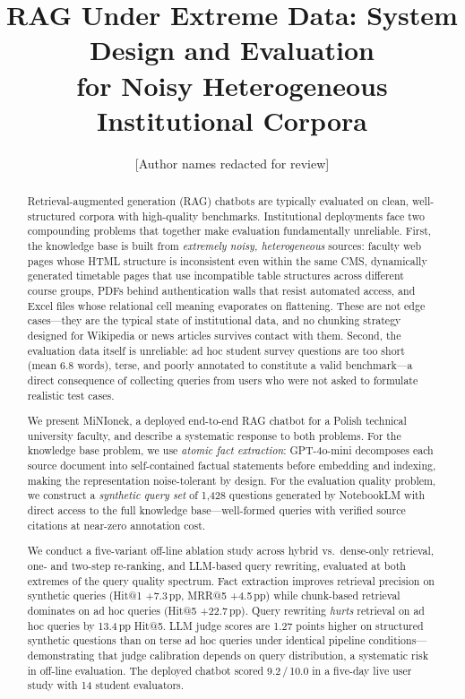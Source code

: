 \documentclass[sigconf,natbib=true]{acmart}
\begin{document}
\title{RAG Under Extreme Data: System Design and Evaluation\\for Noisy Heterogeneous Institutional Corpora}

\author{[Author names redacted for review]}

\begin{abstract}
Retrieval-augmented generation (RAG) chatbots are typically evaluated on clean, well-structured corpora with high-quality benchmarks.
Institutional deployments face two compounding problems that together make evaluation fundamentally unreliable.
First, the knowledge base is built from \emph{extremely noisy, heterogeneous} sources: faculty web pages whose HTML structure is inconsistent even within the same CMS, dynamically generated timetable pages that use incompatible table structures across different course groups, PDFs behind authentication walls that resist automated access, and Excel files whose relational cell meaning evaporates on flattening.
These are not edge cases---they are the typical state of institutional data, and no chunking strategy designed for Wikipedia or news articles survives contact with them.
Second, the evaluation data itself is unreliable: ad hoc student survey questions are too short (mean 6.8 words), terse, and poorly annotated to constitute a valid benchmark---a direct consequence of collecting queries from users who were not asked to formulate realistic test cases.

We present MiNIonek, a deployed end-to-end RAG chatbot for a Polish technical university faculty, and describe a systematic response to both problems.
For the knowledge base problem, we use \emph{atomic fact extraction}: GPT-4o-mini decomposes each source document into self-contained factual statements before embedding and indexing, making the representation noise-tolerant by design.
For the evaluation quality problem, we construct a \emph{synthetic query set} of 1{,}428 questions generated by NotebookLM with direct access to the full knowledge base---well-formed queries with verified source citations at near-zero annotation cost.

We conduct a five-variant off-line ablation study across hybrid vs.\ dense-only retrieval, one- and two-step re-ranking, and LLM-based query rewriting, evaluated at both extremes of the query quality spectrum.
Fact extraction improves retrieval precision on synthetic queries (Hit@1 +7.3\,pp, MRR@5 +4.5\,pp) while chunk-based retrieval dominates on ad hoc queries (Hit@5 +22.7\,pp).
Query rewriting \emph{hurts} retrieval on ad hoc queries by 13.4\,pp Hit@5.
LLM judge scores are 1.27 points higher on structured synthetic questions than on terse ad hoc queries under identical pipeline conditions---demonstrating that judge calibration depends on query distribution, a systematic risk in off-line evaluation.
The deployed chatbot scored 9.2\,/\,10.0 in a five-day live user study with 14 student evaluators.
\end{abstract}
\end{document}
